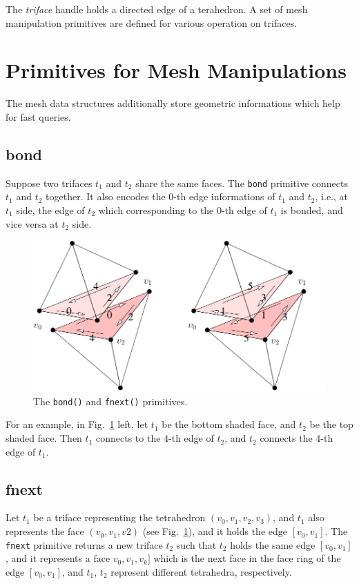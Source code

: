 The {\it triface} handle holds a directed edge of a terahedron. A set of mesh manipulation primitives are defined for various operation on trifaces.

\section{Primitives for Mesh Manipulations}

The mesh data structures additionally store geometric informations which help for fast queries.

\subsection{bond}

Suppose two trifaces $t_1$ and $t_2$ share the same faces. The {\tt bond} primitive connects $t_1$ and $t_2$ together. It also encodes the $0$-th edge informations of $t_1$ and $t_2$, i.e., at $t_1$ side, the edge of $t_2$ which corresponding to the $0$-th edge of $t_1$ is bonded, and vice versa at $t_2$ side.

\begin{figure}
  \centering
  \includegraphics[width=1.0\textwidth]{../figs/fnext-base}
\caption{The {\tt bond()} and {\tt fnext()} primitives.}
\label{fig:fnext}
\end{figure}

For an example, in Fig.~\ref{fig:fnext} left, let $t_1$ be the bottom shaded face, and $t_2$ be the top shaded face. Then $t_1$ connects to the $4$-th edge of $t_2$, and $t_2$ connects the $4$-th edge of $t_1$.

\subsection{fnext}

Let $t_1$ be a triface representing the tetrahedron $(v_0, v_1, v_2, v_3)$, and $t_1$ also represents the face $(v_0, v_1, v2)$ (see Fig.~\ref{fig:fnext}), and it holds the edge $[v_0, v_1]$. The {\tt fnext} primitive returns a new triface $t_2$ such that $t_2$ holds the same edge $[v_0, v_1]$, and it represents a face $v_0, v_1, v_k]$ which is the next face in the face ring of the edge $[v_0, v_1]$, and $t_1$, $t_2$ represent different tetrahedra, respectively. 

